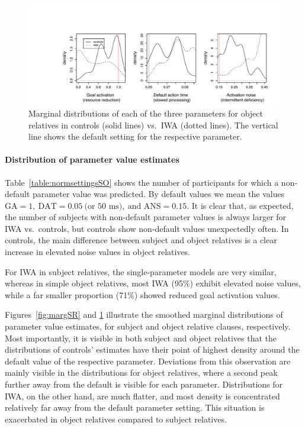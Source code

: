 \documentclass[10pt,letterpaper]{article}
\begin{document}
\begin{figure}[!htbp]
  \centering
  \includegraphics[width=\textwidth]{./figures/margOR.pdf}
  \caption{Marginal distributions of each of the three parameters for object relatives in controls (solid lines) vs.\ IWA (dotted lines). The vertical line shows the default setting for the respective parameter.}
  \label{fig:margOR}
\end{figure}


\paragraph{Distribution of parameter value estimates} 
Table~\ref{table:normsettingsSO} shows the number of participants for which a non-default parameter value was predicted. 
By default values we mean the values $\text{GA} = 1,\ \text{DAT} = 0.05\ \text{(or 50 ms)},\ \text{and ANS} = 0.15$.
It is clear that, as expected, the number of subjects with non-default parameter values is always larger for IWA vs.\ controls, but controls show non-default values unexpectedly often.
In controls, the main difference between subject and object relatives is a clear increase in elevated noise values in object relatives.

For IWA in subject relatives, the single-parameter models are very similar, whereas in simple object relatives, most IWA (95\%) exhibit elevated noise values, while a far smaller proportion (71\%) showed reduced goal activation values. 

Figures~\ref{fig:margSR} and \ref{fig:margOR} illustrate the smoothed marginal distributions of parameter value estimates, for subject and object relative clauses, respectively. Most importantly, it is visible in both subject and object relatives that the distributions of controls' estimates have their point of highest density around the default value of the respective parameter. Deviations from this observation are mainly visible in the distributions for object relatives, where a second peak further away from the default is visible for each parameter. Distributions for IWA, on the other hand, are much flatter, and most density is concentrated relatively far away from the default parameter setting. This situation is exacerbated in object relatives compared to subject relatives.
\end{document}
